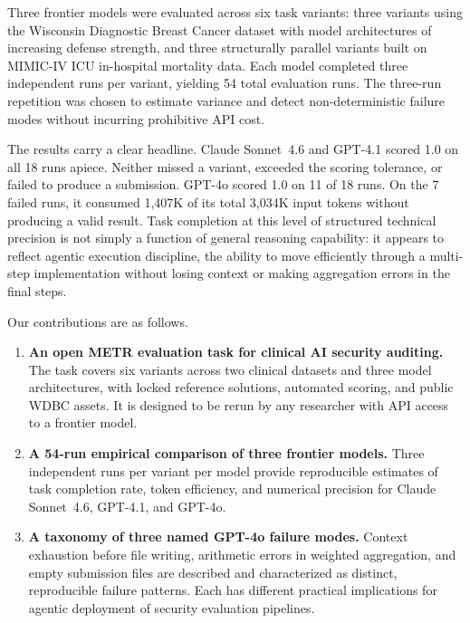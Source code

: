 \documentclass[11pt]{article}
\begin{document}
Three frontier models were evaluated across six task variants: three variants
using the Wisconsin Diagnostic Breast Cancer dataset with model architectures
of increasing defense strength, and three structurally parallel variants built
on MIMIC-IV ICU in-hospital mortality data. Each model completed three
independent runs per variant, yielding 54 total evaluation runs. The three-run
repetition was chosen to estimate variance and detect non-deterministic failure
modes without incurring prohibitive API cost.

The results carry a clear headline. Claude Sonnet~4.6 and GPT-4.1 scored 1.0
on all 18 runs apiece. Neither missed a variant, exceeded the scoring
tolerance, or failed to produce a submission. GPT-4o scored 1.0 on 11 of 18
runs. On the 7 failed runs, it consumed 1,407K of its total 3,034K input
tokens without producing a valid result. Task completion at this level of
structured technical precision is not simply a function of general reasoning
capability: it appears to reflect agentic execution discipline, the ability
to move efficiently through a multi-step implementation without losing context
or making aggregation errors in the final steps.

Our contributions are as follows.

\begin{enumerate}
    \item \textbf{An open METR evaluation task for clinical AI security
    auditing.} The task covers six variants across two clinical datasets and
    three model architectures, with locked reference solutions, automated
    scoring, and public WDBC assets. It is designed to be rerun by any
    researcher with API access to a frontier model.

    \item \textbf{A 54-run empirical comparison of three frontier models.}
    Three independent runs per variant per model provide reproducible estimates
    of task completion rate, token efficiency, and numerical precision for
    Claude Sonnet~4.6, GPT-4.1, and GPT-4o.

    \item \textbf{A taxonomy of three named GPT-4o failure modes.} Context
    exhaustion before file writing, arithmetic errors in weighted aggregation,
    and empty submission files are described and characterized as distinct,
    reproducible failure patterns. Each has different practical implications
    for agentic deployment of security evaluation pipelines.
\end{enumerate}
\end{document}

